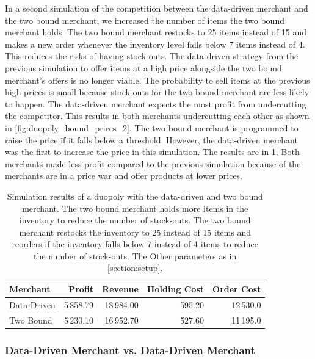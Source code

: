 In a second simulation of the competition between the data-driven merchant and the two bound merchant, we increased the number of items the two bound merchant holds.
The two bound merchant restocks to 25 items instead of 15 and makes a new order whenever the inventory level falls below 7 items instead of 4.
This reduces the risks of having stock-outs.
The data-driven strategy from the previous simulation to offer items at a high price alongside the two bound merchant's offers is no longer viable.
The probability to sell items at the previous high prices is small because stock-outs for the two bound merchant are less likely to happen.
The data-driven merchant expects the most profit from undercutting the competitor.
This results in both merchants undercutting each other as shown in \cref{fig:duopoly_bound_prices_2}.
The two bound merchant is programmed to raise the price if it falls below a threshold.
However, the data-driven merchant was the first to increase the price in this simulation.
The results are in \cref{tab:duopoly_bound_2}.
Both merchants made less profit compared to the previous simulation because of the merchants are in a price war and offer products at lower prices.

\begin{table}[t]
	\centering
	\begin{tabular}{lrrrr}
		\toprule
		\textbf{Merchant} & \textbf{Profit} & \textbf{Revenue} & \textbf{Holding Cost} & \textbf{Order Cost} \\
		\midrule
		Data-Driven & 5\,858.79 & 18\,984.00 & 595.20 & 12\,530.0 \\
		Two Bound & 5\,230.10 & 16\,952.70 & 527.60 & 11\,195.0 \\
		\bottomrule
	\end{tabular}
	\caption[Simulation Results: Data-Driven Merchant versus Two Bound Merchant with Larger Inventory]{Simulation results of a duopoly with the data-driven and two bound merchant. The two bound merchant holds more items in the inventory to reduce the number of stock-outs. The two bound merchant restocks the inventory to 25 instead of 15 items and reorders if the inventory falls below 7 instead of 4 items to reduce the number of stock-outs. The Other parameters as in \cref{section:setup}.}
	\label{tab:duopoly_bound_2}
\end{table}

\subsubsection{Data-Driven Merchant vs. Data-Driven Merchant}

